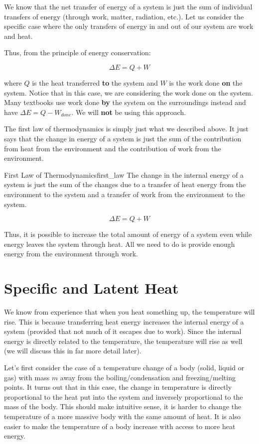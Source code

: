 \documentclass{report}
\begin{document}
We know that the net transfer of energy of a system is just the sum of individual transfers of energy (through work, matter, radiation, etc.). Let us consider the specific case where the only transfers of energy in and out of our system are work and heat.

Thus, from the principle of energy conservation:

$$
\boxed{
\Delta E = Q + W}
$$

where $Q$ is the heat transferred \textbf{to} the system and $W$ is the work done \textbf{on} the system. Notice that in this case, we are considering the work done on the system. Many textbooks use work done \textbf{by} the system on the surroundings instead and have $\Delta E = Q - W_{done}$. We will \textbf{not} be using this approach.

The first law of thermodynamics is simply just what we described above. It just says that the change in energy of a system is just the sum of the contribution from heat from the environment and the contribution of work from the environment.

\begin{mytheo}{First Law of Thermodynamics}{first_law}
    The change in the internal energy of a system is just the sum of the changes due to a transfer of heat energy from the environment to the system and a transfer of work from the environment to the system.
    
    $$\Delta E = Q + W$$

\end{mytheo}


Thus, it is possible to increase the total amount of energy of a system even while energy leaves the system through heat. All we need to do is provide enough energy from the environment through work.  

\section{Specific and Latent Heat}
We know from experience that when you heat something up, the temperature will rise. This is because transferring heat energy increases the internal energy of a system (provided that not much of it escapes due to work). Since the internal energy is directly related to the temperature, the temperature will rise as well (we will discuss this in far more detail later).

Let's first consider the case of a temperature change of a body (solid, liquid or gas) with mass $m$ away from the boiling/condensation and freezing/melting points. It turns out that in this case, the change in temperature is directly proportional to the heat put into the system and inversely proportional to the mass of the body. This should make intuitive sense, it is harder to change the temperature of a more massive body with the same amount of heat. It is also easier to make the temperature of a body increase with access to more heat energy.
\end{document}

